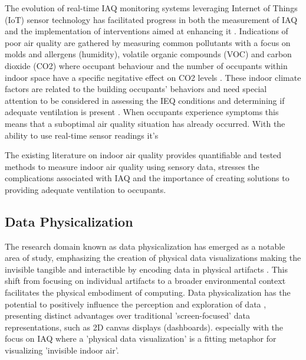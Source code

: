 The evolution of real-time IAQ monitoring systems leveraging Internet of Things (IoT) sensor technology has facilitated progress in both the measurement of IAQ and the implementation of interventions aimed at enhancing it \cite{pantelic_transformational_2022}. Indications of poor air quality are gathered by measuring common pollutants with a focus on molds and allergens (humidity), volatile organic compounds (VOC) and carbon dioxide (CO2) \cite{klepeis_national_2001} where occupant behaviour and the number of occupants within indoor space have a specific negitative effect on CO2 levels \cite{fromme_indoor_2023}. These indoor climate factors are related to the building occupants’ behaviors and need special attention to be considered in assessing the IEQ conditions and determining if adequate ventilation is present \cite{du_indoor_2020}. When occupants experience symptoms this means that a suboptimal air quality situation has already occurred. With the ability to use real-time sensor readings it's 

The existing literature on indoor air quality provides quantifiable and tested methods to measure indoor air quality using sensory data, stresses the complications associated with IAQ and the importance of creating solutions to providing adequate ventilation to occupants. 


\subsection{Data Physicalization}

The research domain known as data physicalization \cite{alexander_data_2019} has emerged as a notable area of study, emphasizing the creation of physical data visualizations making the invisible tangible and interactible by encoding data in physical artifacts \cite{ranasinghe_encoding_2023}. This shift from focusing on individual artifacts to a broader environmental context facilitates the physical embodiment of computing. Data physicalization has the potential to positively influence the perception and exploration of data \cite{jansen_opportunities_2015}, presenting distinct advantages over traditional 'screen-focused' data representations, such as 2D canvas displays (dashboards). \cite{hornecker_design_2023} especially with the focus on IAQ where a 'physical data visualization' is a fitting metaphor for visualizing 'invisible indoor air'.

